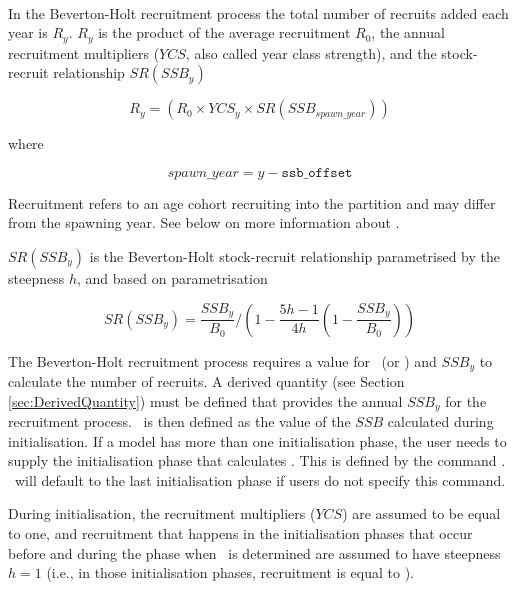 \paragraph{}\label{sec:Process-RecruitmentBevertonHolt}

In the Beverton-Holt recruitment process the total number of recruits added each year is $R_y$. $R_y$ is the product of the average recruitment $R_0$, the annual recruitment multipliers ($YCS$, also called year class strength), and the stock-recruit relationship $SR(SSB_y)$


\begin{equation}\label{eq:BH}
R_{y} = (R_0 \times YCS_{y} \times SR(SSB_{spawn\_year}))
\end{equation}

where

\begin{equation}\label{eq:year_class}
spawn\_year = y - \texttt{ssb\_offset}
\end{equation}

Recruitment refers to an age cohort recruiting into the partition and may differ from the spawning year. See below on more information about .

$SR(SSB_y)$ is the Beverton-Holt stock-recruit relationship parametrised by the steepness $h$, and based on \cite{mace_doonan_88} parametrisation

\begin{equation}\label{eq:BH_SR}
SR(SSB_y) = \frac{SSB_y}{B_0} / \left( 1-\frac{5h-1}{4h} \left( 1-\frac{SSB_y}{B_0} \right) \right)
\end{equation}

The Beverton-Holt recruitment process requires a value for \Bzero\ (or \Rzero) and $SSB_y$ to calculate the number of recruits. A derived quantity (see Section \ref{sec:DerivedQuantity}) must be defined that provides the annual $SSB_y$ for the recruitment process. \Bzero\ is then defined as the value of the $SSB$ calculated during initialisation. If a model has more than one initialisation phase, the user needs to supply the initialisation phase that calculates \Bzero. This is defined by the command . \CNAME\ will default to the last initialisation phase if users do not specify this command.

During initialisation, the recruitment multipliers ($YCS$) are assumed to be equal to one, and recruitment that happens in the initialisation phases that occur before and during the phase when \Bzero\ is determined are assumed to have steepness $h=1$ (i.e., in those initialisation phases, recruitment is equal to \Rzero).

